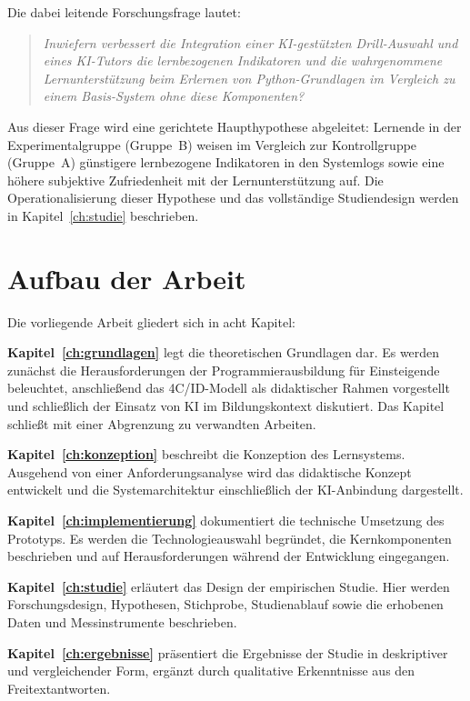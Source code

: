 Die dabei leitende Forschungsfrage lautet:

\begin{quote}
\textit{Inwiefern verbessert die Integration einer KI-gestützten Drill-Auswahl und eines KI-Tutors die lernbezogenen Indikatoren und die wahrgenommene Lernunterstützung beim Erlernen von Python-Grundlagen im Vergleich zu einem Basis-System ohne diese Komponenten?}
\end{quote}

Aus dieser Frage wird eine gerichtete Haupthypothese abgeleitet: Lernende in der Experimentalgruppe (Gruppe~B) weisen im Vergleich zur Kontrollgruppe (Gruppe~A) günstigere lernbezogene Indikatoren in den Systemlogs sowie eine höhere subjektive Zufriedenheit mit der Lernunterstütz\-ung auf. Die Operationalisierung dieser Hypothese und das vollständige Studiendesign werden in Kapitel~\ref{ch:studie} beschrieben.

\clearpage

\section{Aufbau der Arbeit}\label{sec:aufbau}

Die vorliegende Arbeit gliedert sich in acht Kapitel:

\textbf{Kapitel~\ref{ch:grundlagen}} legt die theoretischen Grundlagen dar. Es werden zunächst die Herausforderungen der Programmierausbildung für Einsteigende beleuchtet, anschließend das 4C/ID-Modell als didaktischer Rahmen vorgestellt und schließlich der Einsatz von KI im Bildungskontext diskutiert. Das Kapitel schließt mit einer Abgrenzung zu verwandten Arbeiten.

\textbf{Kapitel~\ref{ch:konzeption}} beschreibt die Konzeption des Lernsystems. Ausgehend von einer Anforderungsanalyse wird das didaktische Konzept entwickelt und die Systemarchitektur einschließlich der KI-Anbindung dargestellt.

\textbf{Kapitel~\ref{ch:implementierung}} dokumentiert die technische Umsetzung des Prototyps. Es werden die Technologieauswahl begründet, die Kernkomponenten beschrieben und auf Herausforderungen während der Entwicklung eingegangen.

\textbf{Kapitel~\ref{ch:studie}} erläutert das Design der empirischen Studie. Hier werden Forschungsdesign, Hypothesen, Stichprobe, Studienablauf sowie die erhobenen Daten und Messinstrumente beschrieben.

\textbf{Kapitel~\ref{ch:ergebnisse}} präsentiert die Ergebnisse der Studie in deskriptiver und vergleichender Form, ergänzt durch qualitative Erkenntnisse aus den Freitextantworten.

